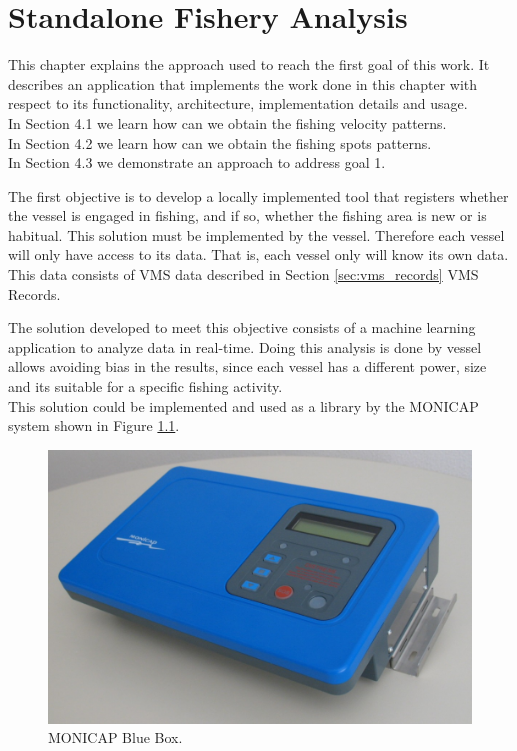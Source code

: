 % 
% 
%
\chapter{Standalone Fishery Analysis}
\label{cha:standalone_fishery_analysis}
This chapter explains the approach used to reach the first goal of this work. It describes an application that implements the work done in this chapter with respect to its functionality, architecture, implementation details and usage. \\
In Section 4.1 we learn how can we obtain the fishing velocity patterns.\\
In Section 4.2 we learn how can we obtain the fishing spots patterns. \\
In Section 4.3 we demonstrate an approach to address goal 1.

The first objective is to develop a locally implemented tool that registers whether the vessel is engaged in fishing, and if so, whether the fishing area is new or is habitual. This solution must be implemented by the vessel. Therefore each vessel will only have access to its data. That is, each vessel only will know its own data. This data consists of VMS data described in Section \ref{sec:vms_records} VMS Records.

The solution developed to meet this objective consists of a machine learning application to analyze data in real-time.
Doing this analysis is done by vessel allows avoiding bias in the results, since each vessel has a different power, size and its suitable for a specific fishing activity.\\
This solution could be implemented and used as a library by the MONICAP \cite{WEBSITE:MonicapXsealence} system shown in Figure \ref{fig:monicap}.

\begin{figure}[H]
\centering
\includegraphics[width=0.8\linewidth]{Chapters/img/equipamento_monicap.png}
\caption{MONICAP Blue Box.}
\label{fig:monicap}
\end{figure}

